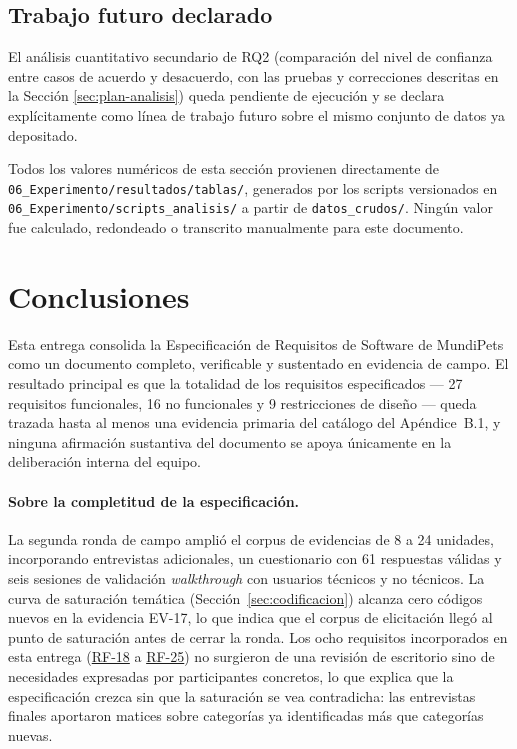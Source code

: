 \documentclass[journal,onecolumn]{IEEEtran}
\begin{document}
\subsection{Trabajo futuro declarado}
\label{sec:futuro}

El análisis cuantitativo secundario de RQ2 (comparación del nivel de
confianza entre casos de acuerdo y desacuerdo, con las pruebas y
correcciones descritas en la Sección \ref{sec:plan-analisis}) queda
pendiente de ejecución y se declara explícitamente como línea de trabajo
futuro sobre el mismo conjunto de datos ya depositado.

Todos los valores numéricos de esta sección provienen directamente de
\texttt{06\_Experimento/resultados/tablas/}, generados por los scripts
versionados en \texttt{06\_Experimento/scripts\_analisis/} a partir de
\texttt{datos\_crudos/}. Ningún valor fue calculado, redondeado o
transcrito manualmente para este documento.


	\newpage
	\section{Conclusiones}
	\label{sec:conclusiones}
	
	Esta entrega consolida la Especificación de Requisitos de Software de
	MundiPets como un documento completo, verificable y sustentado en evidencia
	de campo. El resultado principal es que la totalidad de los requisitos
	especificados --- 27 requisitos funcionales, 16 no funcionales y 9
	restricciones de diseño --- queda trazada hasta al menos una evidencia
	primaria del catálogo del Apéndice~B.1, y ninguna afirmación sustantiva del
	documento se apoya únicamente en la deliberación interna del equipo.
	
	\paragraph{Sobre la completitud de la especificación.}
	La segunda ronda de campo amplió el corpus de evidencias de 8 a 24 unidades,
	incorporando entrevistas adicionales, un cuestionario con 61 respuestas
	válidas y seis sesiones de validación \emph{walkthrough} con usuarios
	técnicos y no técnicos. La curva de saturación temática
	(Sección~\ref{sec:codificacion}) alcanza cero códigos nuevos en la evidencia
	EV-17, lo que indica que el corpus de elicitación llegó al punto de
	saturación antes de cerrar la ronda. Los ocho requisitos incorporados en esta
	entrega (\hyperref[tab:RF-18]{RF-18} a \hyperref[tab:RF-25]{RF-25}) no surgieron de una revisión de escritorio sino de
	necesidades expresadas por participantes concretos, lo que explica que la
	especificación crezca sin que la saturación se vea contradicha: las
	entrevistas finales aportaron matices sobre categorías ya identificadas más
	que categorías nuevas.
	
\end{document}
